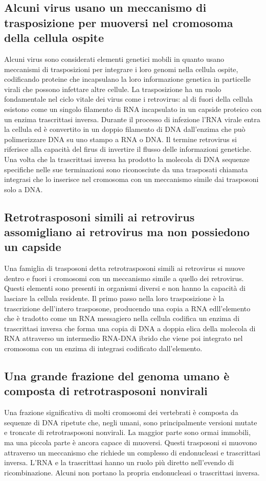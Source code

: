 \subsection{Alcuni virus usano un meccanismo di trasposizione per muoversi nel cromosoma della cellula ospite}
Alcuni virus sono considerati elementi genetici mobili in quanto usano meccanismi di trasposizioni per integrare i loro genomi nella cellula ospite, codificando proteine che incapsulano
la loro informazione genetica in particelle virali che possono infettare altre cellule. La trasposizione ha un ruolo fondamentale nel ciclo vitale dei virus come i retrovirus: al di
fuori della cellula esistono come un singolo filamento di RNA incapsulato in un capside proteico con un enzima trascrittasi inversa. Durante il processo di infezione l'RNA virale 
entra la cellula ed \`e convertito in un doppio filamento di DNA dall'enzima che pu\`o polimerizzare DNA su uno stampo a RNA o DNA. Il termine retrovirus si riferisce alla capacit\`a
del firus di invertire il flusso delle informazioni genetiche. Una volta che la trascrittasi inversa ha prodotto la molecola di DNA sequenze specifiche nelle sue terminazioni sono 
riconosciute da una trasposati chiamata integrasi che lo inserisce nel cromosoma con un meccanismo simile dai trasposoni solo a DNA.
\subsection{Retrotrasposoni simili ai retrovirus assomigliano ai retrovirus ma non possiedono un capside}
Una famiglia di trasposoni detta retrotrasposoni simili ai retrovirus si muove dentro e fuori i cromosomi con un meccanismo simile a quello dei retrovirus. Questi elementi sono presenti
in organismi diversi e non hanno la capacit\`a di lasciare la cellula residente. Il primo passo nella loro trasposizione \`e la trascrizione dell'intero trasposone, producendo una 
copia a RNA edll'elemento che \`e tradotto come un RNA messagiero nella cellula codifica un enzima di trascrittasi inversa che forma una copia di DNA a doppia elica della molecola di 
RNA attraverso un intermedio RNA-DNA ibrido che viene poi integrato nel cromosoma con un enzima di integrasi codificato dall'elemento. 
\subsection{Una grande frazione del genoma umano \`e composta di retrotrasposoni nonvirali}
Una frazione significativa di molti cromosomi dei vertebrati \`e composta da sequenze di DNA ripetute che, negli umani, sono principalmente versioni mutate e troncate di retrotrasposoni
nonvirali. La maggior parte sono ormai immobili, ma una piccola parte \`e ancora capace di muoversi. Questi trasposoni si muovono attraverso un meccanismo che richiede un complesso di
endonucleasi e trascrittasi inversa. L'RNA e la trascrittasi hanno un ruolo pi\`u diretto nell'evendo di ricombinazione. Alcuni non portano la propria endonucleasi o trascrittasi 
inversa.

